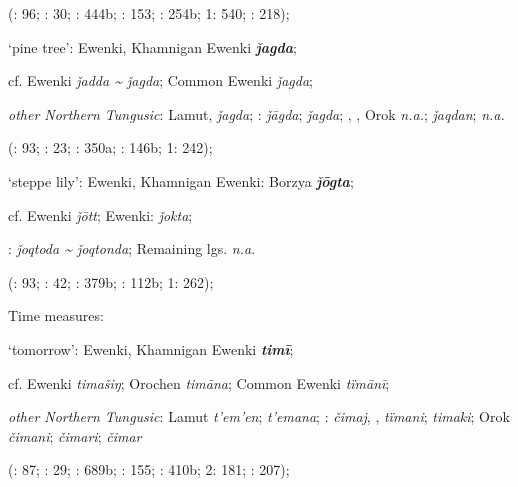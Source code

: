 \documentclass[output=paper,colorlinks,citecolor=brown]{langscibook}
\begin{document}
\begin{xlist}
\begin{xlist}
    (\citealt{Castrén1856}: 96; \citealt{Janhunen1991}: 30; \citealt{Dorji1998}: 444b; \citealt{Chaoke2014a}: 153; \citealt{Vasilevic1958}: 254b; \citealt{Cincius1975B} 1: 540; \citealt{Zikmundová2013a}: 218);

    \ex ‘pine tree’:  Ewenki, Khamnigan Ewenki \textbf{\textit{ǰagda}};

    cf.  Ewenki \textit{ǰadda {\textasciitilde} ǰagda};  Common Ewenki \textit{ǰagda};

    \textit{other Northern Tungusic}: Lamut,  \textit{ǰagda}; \textit{}:  \textit{ǰāgda};  \textit{ǰagda}; , , Orok \textit{n.a.};  \textit{ǰaqdan};  \textit{n.a.}
    
    (\citealt{Castrén1856}: 93; \citealt{Janhunen1991}: 23; \citealt{Dorji1998}: 350a; \citealt{Vasilevic1958}: 146b; \citealt{Cincius1975B} 1: 242);

    \ex ‘steppe lily’:  Ewenki, Khamnigan Ewenki: Borzya \textbf{\textit{ǰōgta}};

    cf.  Ewenki \textit{ǰōtt};  Ewenki:  \textit{ǰokta};

    \textit{}:  \textit{ǰoqtoda {\textasciitilde} ǰoqtonda}; Remaining lgs. \textit{n.a}.
    
    (\citealt{Castrén1856}: 93; \citealt{Janhunen1991}: 42; \citealt{Dorji1998}: 379b; \citealt{Vasilevic1958}: 112b; \citealt{Cincius1975B} 1: 262);

\end{xlist}

    \ex Time measures:

\begin{xlist}
    \ex ‘tomorrow’:  Ewenki, Khamnigan Ewenki \textbf{\textit{timī}};

    cf.  Ewenki \textit{timašiŋ}; Orochen \textit{timāna};  Common Ewenki \textit{tïmānī};

    \textit{other Northern Tungusic}: Lamut \textit{t’em’en};  \textit{t’emana}; \textit{}:  \textit{čimaj}, ,  \textit{tïmani};  \textit{timaki}; Orok \textit{čimani};  \textit{čimari};  \textit{čimar} 
    
    (\citealt{Castrén1856}: 87; \citealt{Janhunen1991}: 29; \citealt{Dorji1998}: 689b; \citealt{Chaoke2014a}: 155; \citealt{Vasilevic1958}: 410b; \citealt{Cincius1975B} 2: 181; \citealt{Zikmundová2013a}: 207);


\end{xlist}
\end{xlist}
\end{document}
